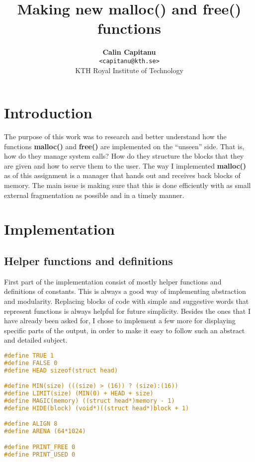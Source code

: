 \documentclass[a4paper,10pt]{article}
\title{\vspace{-1.5em}\textbf{Making new malloc() and free() functions}}
\author{{\textbf{Calin Capitanu}} \\
        {\texttt{<capitanu@kth.se>}} \\
        {KTH Royal Institute of Technology}}
\begin{document}
\maketitle

\section*{Introduction}
The purpose of this work was to research and better understand
how the functions \textbf{malloc()} and \textbf{free()} are implemented
on the ``unseen'' side. That is, how do they manage system calls? How
do they structure the blocks that they are given and how to serve
them to the user. The way I implemented \textbf{malloc()} as of this assignment is a manager that hands out and receives back blocks of memory. The main issue is making sure that this is done efficiently with as small external fragmentation as possible and in a timely manner.
\section*{Implementation}
\subsection*{Helper functions and definitions}
First part of the implementation consist of mostly helper functions and definitions of constants. This is always a good way of implementing abstraction and modularity. Replacing blocks of code with simple and suggestive words that represent functions is always helpful for future simplicity. Besides the ones that I have already been asked for, I chose to implement a few more for displaying specific parts of the output, in order to make it easy to follow such an abstract and detailed subject.
\vspace{5mm}
\begin{lstlisting}[language=C]
#define TRUE 1
#define FALSE 0
#define HEAD sizeof(struct head)

#define MIN(size) (((size) > (16)) ? (size):(16))
#define LIMIT(size) (MIN(0) + HEAD + size)
#define MAGIC(memory) ((struct head*)memory - 1)
#define HIDE(block) (void*)((struct head*)block + 1)

#define ALIGN 8
#define ARENA (64*1024)

#define PRINT_FREE 0
#define PRINT_USED 0

\end{lstlisting}
\vspace{5mm}
\end{document}
